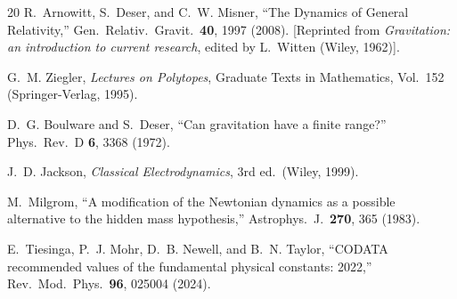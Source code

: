 \documentclass[aps,prd,preprint,superscriptaddress,showpacs,preprintnumbers,amsmath,amssymb,nofootinbib]{revtex4-2}
\begin{document}
\begin{thebibliography}{20}
R.~Arnowitt, S.~Deser, and C.~W. Misner, ``The Dynamics of General Relativity,'' Gen.\ Relativ.\ Gravit.\ \textbf{40}, 1997 (2008). [Reprinted from \emph{Gravitation: an introduction to current research}, edited by L.~Witten (Wiley, 1962)].

G.~M. Ziegler, \emph{Lectures on Polytopes}, Graduate Texts in Mathematics, Vol.~152 (Springer-Verlag, 1995).

D.~G. Boulware and S.~Deser, ``Can gravitation have a finite range?'' Phys.\ Rev.\ D \textbf{6}, 3368 (1972).

J.~D. Jackson, \emph{Classical Electrodynamics}, 3rd ed.\ (Wiley, 1999).

M.~Milgrom, ``A modification of the Newtonian dynamics as a possible alternative to the hidden mass hypothesis,'' Astrophys.\ J.\ \textbf{270}, 365 (1983).

E.~Tiesinga, P.~J. Mohr, D.~B. Newell, and B.~N. Taylor, ``CODATA recommended values of the fundamental physical constants: 2022,'' Rev.\ Mod.\ Phys.\ \textbf{96}, 025004 (2024).

\end{thebibliography}
\end{document}
